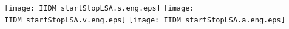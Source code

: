 \documentclass[a4paper,12pt]{article}
\begin{document}

\begin{center}
\texttt{[image: IIDM\_startStopLSA.s.eng.eps]} 
\texttt{[image: IIDM\_startStopLSA.v.eng.eps]}
\texttt{[image: IIDM\_startStopLSA.a.eng.eps]}
\end{center}

\end{document}
